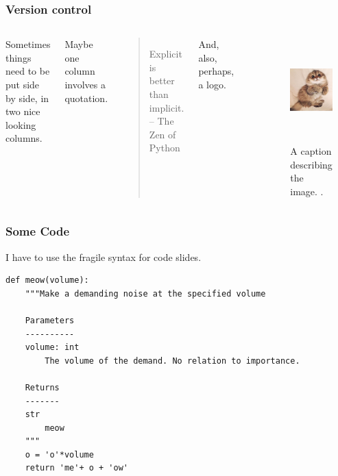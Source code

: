 \begin{frame}
  \frametitle{Version control}
        \begin{columns}
                \column[t]{5cm}
                Sometimes things need to be put side by side, in two nice 
                looking columns. 

                Maybe one column involves a quotation.

                \begin{quote}
                        Explicit is better than implicit. -- The Zen of Python
                \end{quote}


                And, also, perhaps, a logo.
                \begin{center}
                        \includegraphics[height=0.2\textheight]{./images/arfc-logo}
                \end{center}
                \column[t]{5cm}
        \begin{figure}[htbp!]
        \begin{center}
      \includegraphics[height=4cm]{./images/kitten}
    \end{center}
          \caption{A caption describing the image. \cite{lastname_firstword_1900}.}
    \label{fig:kittenfigure}
  \end{figure}
        \end{columns}
\end{frame}

\begin{frame}[fragile]
  \frametitle{Some Code}
        I have to use the fragile syntax for code slides.
        \begin{verbatim}
def meow(volume):
    """Make a demanding noise at the specified volume
    
    Parameters
    ----------
    volume: int
        The volume of the demand. No relation to importance.

    Returns
    -------
    str
        meow
    """
    o = 'o'*volume
    return 'me'+ o + 'ow'
\end{verbatim}
\end{frame}
